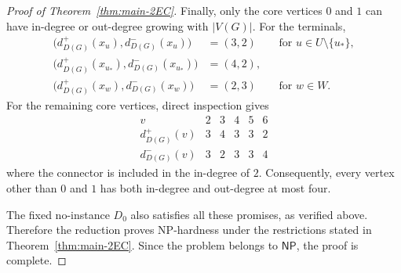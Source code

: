 \documentclass[10pt,a4paper]{amsart}
\newcommand{\NP}{\mathsf{NP}}
\begin{document}
\begin{proof}[Proof of Theorem~\ref{thm:main-2EC}]
Finally, only the core vertices $0$ and $1$ can have in-degree or out-degree growing with $|V(G)|$. For the terminals,
\[
\begin{aligned}
 \bigl(d_{D(G)}^+(x_u),d_{D(G)}^-(x_u)\bigr)
   &=(3,2)
   &&\text{for }u\in U\setminus\{u_*\},\\
 \bigl(d_{D(G)}^+(x_{u_*}),d_{D(G)}^-(x_{u_*})\bigr)
   &=(4,2),\\
 \bigl(d_{D(G)}^+(x_w),d_{D(G)}^-(x_w)\bigr)
   &=(2,3)
   &&\text{for }w\in W.
\end{aligned}
\]
For the remaining core vertices, direct inspection gives
\[
\begin{array}{c|ccccc}
 v & 2 & 3 & 4 & 5 & 6\\ \hline
 d_{D(G)}^+(v) & 3 & 4 & 3 & 3 & 2\\
 d_{D(G)}^-(v) & 3 & 2 & 3 & 3 & 4
\end{array}
\]
where the connector is included in the in-degree of $2$. Consequently, every vertex other than $0$ and $1$ has both in-degree and out-degree at most four.

The fixed no-instance $D_0$ also satisfies all these promises, as verified above.  Therefore the reduction proves NP-hardness under
the restrictions stated in Theorem~\ref{thm:main-2EC}.  Since the problem belongs to $\NP$, the proof is complete.
\end{proof}
\end{document}
